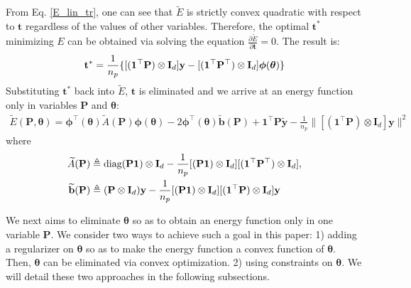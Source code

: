 \documentclass[11pt,bezier,]{article}
\begin{document}
From 
Eq. \eqref{E_lin_tr},
one can see   that 
$\widetilde E$ is  strictly convex quadratic with respect to ${\mathbf t}$
regardless of the  values of other variables. %
Therefore,
the optimal ${\mathbf t^*}$ minimizing $E$ 
can be obtained via solving the equation $\frac{\partial \widetilde E}{\partial {\mathbf t}}=0$.
The result is: 
\[
 {\mathbf t^*}
 =\frac{1}{n_p}\{[ ({\mathbf 1}^\top\mathbf P)\otimes \mathbf I_d ] \mathbf y 
 - [ ({\mathbf 1}^\top\mathbf P^\top)\otimes \mathbf I_d ] \boldsymbol\phi(\boldsymbol\theta) \}  \notag
\]
Substituting  $ {\mathbf t^*}$ back  into $\widetilde E$,
$\mathbf t$ is eliminated and 
we arrive at an energy function only in variables $\mathbf P$ and ${\boldsymbol\theta}$:
\begin{align}
 \widetilde E (\mathbf P,{\boldsymbol\theta})= %
\boldsymbol\phi^\top(\boldsymbol\theta) \widetilde A(\mathbf P) \boldsymbol\phi(\boldsymbol\theta) 
-2 \boldsymbol\phi^\top(\boldsymbol\theta)\widetilde{\mathbf b} (\mathbf P) 
 + {\mathbf 1}^\top\mathbf P \mathbf{\widetilde y}  %
-\frac{1}{n_p} 
\|[({\mathbf 1}^\top\mathbf P) \otimes \mathbf I_d]\mathbf y \|^2 \label{eng_no_tran}
\end{align}
where
\begin{align}
\widetilde{A} (\mathbf P) &\triangleq   \text{diag}(\mathbf P\mathbf 1)\otimes \mathbf I_d    %
 -\frac{1}{n_p}  [(\mathbf P\mathbf 1)\otimes \mathbf I_d][(\mathbf 1^\top \mathbf P^\top)\otimes \mathbf I_d],   \notag\\
\widetilde{\mathbf b} (\mathbf P)  &\triangleq   (\mathbf P\otimes \mathbf I_d)\mathbf y
-\frac{1}{n_p}  [(\mathbf P\mathbf 1)\otimes \mathbf I_d][(\mathbf 1^\top \mathbf P)\otimes \mathbf I_d]\mathbf y   \notag
\end{align}

We next aims to eliminate $\boldsymbol\theta$ so as to
obtain   an energy function only in one variable $\mathbf P$.
We consider two ways  to achieve  such a goal   in this paper:
1) adding a regularizer on $\boldsymbol\theta$ 
so as to make  the energy function   a convex function of  $\boldsymbol\theta$.
Then,
$\boldsymbol\theta$ can be eliminated via convex optimization.
2) 
using   constraints on $\boldsymbol\theta$.
We will detail these two approaches in the following subsections.
\end{document}
